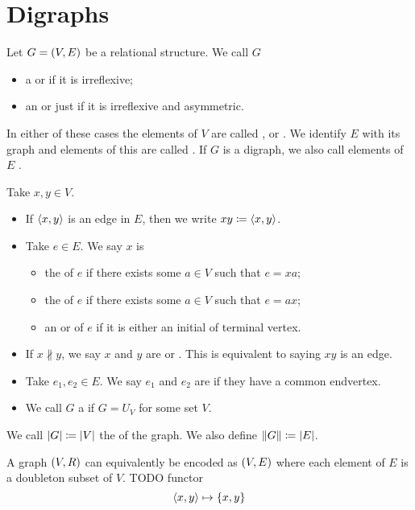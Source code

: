 \section{Digraphs}
\begin{definition}
Let $G = \left( V,E \right)$ be a relational structure. We call $G$
\begin{itemize}
\item a  or  if it is irreflexive;
\item an  or just  if it is irreflexive and asymmetric.
\end{itemize}
In either of these cases the elements of $V$ are called ,  or . We identify $E$ with its graph and elements of this are called . If $G$ is a digraph, we also call elements of $E$ .

Take $x,y \in V$.
\begin{itemize}
\item If $\left\langle x,y \right\rangle$ is an edge in $E$, then we write $xy \coloneqq \left\langle x,y \right\rangle$.
\item Take $e\in E$. We say $x$ is
\begin{itemize}
\item the  of $e$ if there exists some $a\in V$ such that $e = xa$;
\item the  of $e$ if there exists some $a\in V$ such that $e = ax$;
\item an  or  of $e$ if it is either an initial of terminal vertex.
\end{itemize}
\item If $x \nparallel y$, we say $x$ and $y$ are  or . This is equivalent to saying $xy$ is an edge.
\item Take $e_1,e_2 \in E$. We say $e_1$ and $e_2$ are  if they have a common endvertex.
\item We call $G$ a  if $G = U_V$ for some set $V$.
\end{itemize}

We call $|G| \coloneqq |V|$ the  of the graph. We also define $\lVert G\rVert \coloneqq |E|$.
\end{definition}

\begin{lemma}
A graph $\left( V,R \right)$ can equivalently be encoded as $\left( V, E \right)$ where each element of $E$ is a doubleton subset of $V$. TODO functor
\[ \left\langle x,y \right\rangle \mapsto \{x,y\} \]
\end{lemma}

